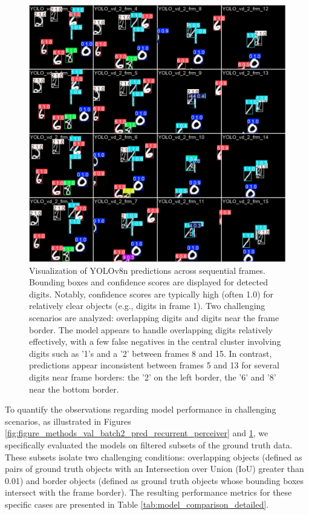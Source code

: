 \begin{figure}
    \centering
    \includegraphics[width=\textwidth]{figures/figure_methods_val_batch2_pred_YOLO.jpg}
    \caption{Visualization of YOLOv8n \cite{Jocher_Ultralytics_YOLO_2023} predictions across sequential frames. Bounding boxes and confidence scores are displayed for detected digits. Notably, confidence scores are typically high (often 1.0) for relatively clear objects (e.g., digits in frame 1). Two challenging scenarios are analyzed: overlapping digits and digits near the frame border. The model appears to handle overlapping digits relatively effectively, with a few false negatives in the central cluster involving digits such as '1's and a '2' between frames 8 and 15. In contrast, predictions appear inconsistent between frames 5 and 13 for several digits near frame borders: the '2' on the left border, the '6' and '8' near the bottom border.}
    \label{fig:figure_methods_val_batch2_pred_YOLO}
\end{figure}


To quantify the observations regarding model performance in challenging scenarios, as illustrated in Figures \ref{fig:figure_methods_val_batch2_pred_recurrent_perceiver} and \ref{fig:figure_methods_val_batch2_pred_YOLO}, we specifically evaluated the models on filtered subsets of the ground truth data. These subsets isolate two challenging conditions: overlapping objects (defined as pairs of ground truth objects with an Intersection over Union (IoU) greater than 0.01) and border objects (defined as ground truth objects whose bounding boxes intersect with the frame border). The resulting performance metrics for these specific cases are presented in Table \ref{tab:model_comparison_detailed}.

